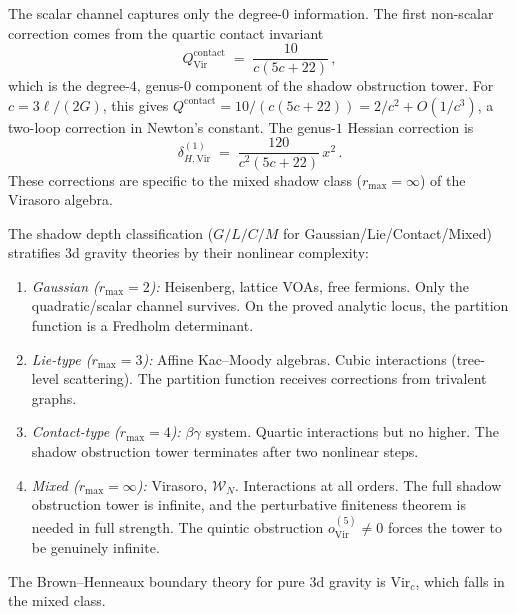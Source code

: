 \begin{remark}
The scalar channel captures only the degree-$0$ information. The first non-scalar correction comes from the quartic contact invariant
\begin{equation}%
Q^{\mathrm{contact}}_{\mathrm{Vir}} \;=\; \frac{10}{c(5c+22)}\,,
\end{equation}
which is the degree-$4$, genus-$0$ component of the shadow obstruction tower. For $c = 3\ell/(2G)$, this gives $Q^{\mathrm{contact}} = 10/(c(5c+22)) = 2/c^2 + O(1/c^3)$, a two-loop correction in Newton's constant. The genus-$1$ Hessian correction is
\begin{equation}%
\delta_{H,\mathrm{Vir}}^{(1)} \;=\; \frac{120}{c^2(5c+22)}\,x^2\,.
\end{equation}
These corrections are specific to the mixed shadow class ($r_{\max} = \infty$) of the Virasoro algebra.
\end{remark}

\begin{remark}
The shadow depth classification ($G/L/C/M$ for Gaussian/Lie/Contact/Mixed) stratifies 3d gravity theories by their nonlinear complexity:
\begin{enumerate}[label=\textup{(\alph*)}]
\item \emph{Gaussian ($r_{\max} = 2$):} Heisenberg, lattice VOAs, free fermions. Only the quadratic/scalar channel survives. On the proved analytic locus, the partition function is a Fredholm determinant.
\item \emph{Lie-type ($r_{\max} = 3$):} Affine Kac--Moody algebras. Cubic interactions (tree-level scattering). The partition function receives corrections from trivalent graphs.
\item \emph{Contact-type ($r_{\max} = 4$):} $\beta\gamma$ system. Quartic interactions but no higher. The shadow obstruction tower terminates after two nonlinear steps.
\item \emph{Mixed ($r_{\max} = \infty$):} Virasoro, $\mathcal{W}_N$. Interactions at all orders. The full shadow obstruction tower is infinite, and the perturbative finiteness theorem is needed in full strength. The quintic obstruction $o^{(5)}_{\mathrm{Vir}} \neq 0$ forces the tower to be genuinely infinite.
\end{enumerate}
The Brown--Henneaux boundary theory for pure 3d gravity is $\mathrm{Vir}_c$, which falls in the mixed class.
\end{remark}


